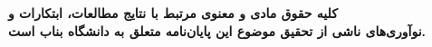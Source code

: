 \thispagestyle{empty}
\begin{singlespace}
\vspace*{\fill}
\begin{center}
{\large\bfseries کلیه حقوق مادی و معنوی مرتبط با نتایج مطالعات، ابتکارات و\\
نوآوری‌های ناشی از تحقیق موضوع این پایان‌نامه متعلق به دانشگاه بناب است.}
\end{center}
\vspace*{\fill}
\end{singlespace}
\clearpage
